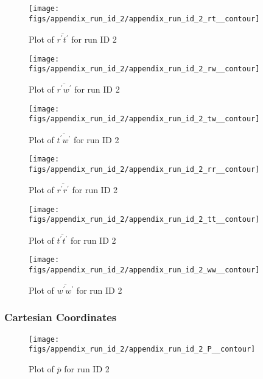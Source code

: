 \begin{figure}[H]
\centering
\texttt{[image: figs/appendix\_run\_id\_2/appendix\_run\_id\_2\_rt\_\_contour]}
\caption{Plot of $\overline{r^\prime t^\prime}$ for run ID 2}
\label{fig:appendix_run_id_2_rt__contour}
\end{figure}


\begin{figure}[H]
\centering
\texttt{[image: figs/appendix\_run\_id\_2/appendix\_run\_id\_2\_rw\_\_contour]}
\caption{Plot of $\overline{r^\prime w^\prime}$ for run ID 2}
\label{fig:appendix_run_id_2_rw__contour}
\end{figure}


\begin{figure}[H]
\centering
\texttt{[image: figs/appendix\_run\_id\_2/appendix\_run\_id\_2\_tw\_\_contour]}
\caption{Plot of $\overline{t^\prime w^\prime}$ for run ID 2}
\label{fig:appendix_run_id_2_tw__contour}
\end{figure}


\begin{figure}[H]
\centering
\texttt{[image: figs/appendix\_run\_id\_2/appendix\_run\_id\_2\_rr\_\_contour]}
\caption{Plot of $\overline{r^\prime r^\prime}$ for run ID 2}
\label{fig:appendix_run_id_2_rr__contour}
\end{figure}


\begin{figure}[H]
\centering
\texttt{[image: figs/appendix\_run\_id\_2/appendix\_run\_id\_2\_tt\_\_contour]}
\caption{Plot of $\overline{t^\prime t^\prime}$ for run ID 2}
\label{fig:appendix_run_id_2_tt__contour}
\end{figure}


\begin{figure}[H]
\centering
\texttt{[image: figs/appendix\_run\_id\_2/appendix\_run\_id\_2\_ww\_\_contour]}
\caption{Plot of $\overline{w^\prime w^\prime}$ for run ID 2}
\label{fig:appendix_run_id_2_ww__contour}
\end{figure}


\subsubsection{Cartesian Coordinates}
\begin{figure}[H]
\centering
\texttt{[image: figs/appendix\_run\_id\_2/appendix\_run\_id\_2\_P\_\_contour]}
\caption{Plot of $\overline{p}$ for run ID 2}
\label{fig:appendix_run_id_2_P__contour}
\end{figure}


